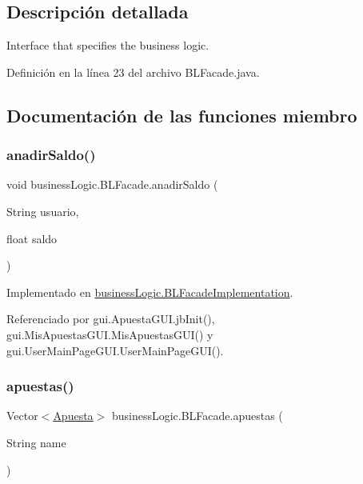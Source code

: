 \subsection{Descripción detallada}
Interface that specifies the business logic. 

Definición en la línea 23 del archivo B\+L\+Facade.\+java.



\subsection{Documentación de las funciones miembro}
\mbox{\label{interfacebusinessLogic_1_1BLFacade_a7327ebe6d1046c51d614553747d670f5}} 
\subsubsection{\texorpdfstring{anadirSaldo()}{anadirSaldo()}}
{\footnotesize\ttfamily void business\+Logic.\+B\+L\+Facade.\+anadir\+Saldo (\begin{DoxyParamCaption}\item[{String}]{usuario,  }\item[{float}]{saldo }\end{DoxyParamCaption})}



Implementado en \mbox{\hyperlink{classbusinessLogic_1_1BLFacadeImplementation_a5e1a613d087a9d566c01d227e21f0b34}{business\+Logic.\+B\+L\+Facade\+Implementation}}.



Referenciado por gui.\+Apuesta\+G\+U\+I.\+jb\+Init(), gui.\+Mis\+Apuestas\+G\+U\+I.\+Mis\+Apuestas\+G\+U\+I() y gui.\+User\+Main\+Page\+G\+U\+I.\+User\+Main\+Page\+G\+U\+I().

\mbox{\label{interfacebusinessLogic_1_1BLFacade_adfadb667916c0f312ad1794b052e0cbf}} 
\subsubsection{\texorpdfstring{apuestas()}{apuestas()}}
{\footnotesize\ttfamily Vector$<$\mbox{\hyperlink{classdomain_1_1Apuesta}{Apuesta}}$>$ business\+Logic.\+B\+L\+Facade.\+apuestas (\begin{DoxyParamCaption}\item[{String}]{name }\end{DoxyParamCaption})}



